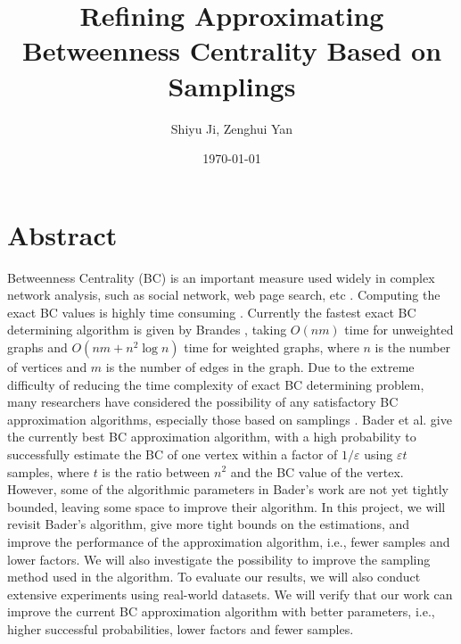 \documentclass[10pt]{article}
\begin{document}
\title{Refining Approximating Betweenness Centrality Based on Samplings}
\author{Shiyu Ji, Zenghui Yan}
\date{\today}
\maketitle

\newtheorem{definition}{Definition}
\newtheorem{theorem}{Theorem}
\newtheorem{lemma}{Lemma}
\newtheorem{corollary}{Corollary}

\newcommand{\p}{\mathrm{Pr}}

\section{Abstract}
Betweenness Centrality (BC) is an important measure used widely in complex network analysis, such as social network, web page search, etc \cite{barthelemy2004betweenness}. Computing the exact BC values is highly time consuming \cite{brandes2001faster, brandes2008variants}. Currently the fastest exact BC determining algorithm is given by Brandes \cite{brandes2001faster}, taking $O(nm)$ time for unweighted graphs and $O(nm+n^2\log n)$ time for weighted graphs, where $n$ is the number of vertices and $m$ is the number of edges in the graph. Due to the extreme difficulty of reducing the time complexity of exact BC determining problem, many researchers have considered the possibility of any satisfactory BC approximation algorithms, especially those based on samplings \cite{bader2007approximating, geisberger2008better}. Bader et al. \cite{bader2007approximating} give the currently best BC approximation algorithm, with a high probability to successfully estimate the BC of one vertex within a factor of $1/\varepsilon$ using $\varepsilon t$ samples, where $t$ is the ratio between $n^2$ and the BC value of the vertex. However, some of the algorithmic parameters in Bader's work are not yet tightly bounded, leaving some space to improve their algorithm. In this project, we will revisit Bader's algorithm, give more tight bounds on the estimations, and improve the performance of the approximation algorithm, i.e., fewer samples and lower factors. We will also investigate the possibility to improve the sampling method used in the algorithm. To evaluate our results, we will also conduct extensive experiments using real-world datasets. We will verify that our work can improve the current BC approximation algorithm with better parameters, i.e., higher successful probabilities, lower factors and fewer samples.
\end{document}
